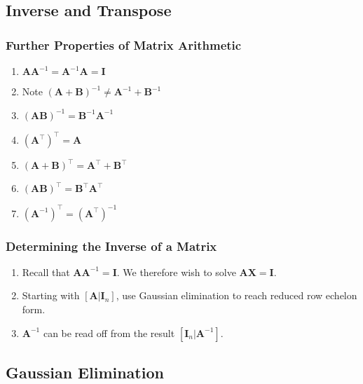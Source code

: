 \documentclass[10pt,twoside,twocolumn]{article}
\begin{document}
\subsection{Inverse and Transpose}


\subsubsection{Further Properties of Matrix Arithmetic}
\begin{enumerate}
\item $\mathbf{A}\mathbf{A}^{-1}=\mathbf{A}^{-1}\mathbf{A}=\mathbf{I}$ 
\item Note $\left(\mathbf{A}+\mathbf{B}\right)^{-1}\neq\mathbf{A}^{-1}+\mathbf{B}^{-1}$ 
\item $\left(\mathbf{A}\mathbf{B}\right)^{-1}=\mathbf{B}^{-1}\mathbf{A}^{-1}$\\
 
\item $\left(\mathbf{A}^{\top}\right)^{\top}=\mathbf{A}$ 
\item $\left(\mathbf{A}+\mathbf{B}\right)^{\top}=\mathbf{A}^{\top}+\mathbf{B}^{\top}$ 
\item $\left(\mathbf{A}\mathbf{B}\right)^{\top}=\mathbf{B}^{\top}\mathbf{A}^{\top}$\\
 
\item $\left(\mathbf{A}^{-1}\right)^{\top}=\left(\mathbf{A}^{\top}\right)^{-1}$ 
\end{enumerate}

\subsubsection{Determining the Inverse of a Matrix}
\begin{enumerate}
\item Recall that $\mathbf{A}\mathbf{A}^{-1}=\mathbf{I}$. We therefore
wish to solve $\mathbf{A}\mathbf{X}=\mathbf{I}$. 
\item Starting with $\left[\mathbf{A}|\mathbf{I}_{n}\right]$, use Gaussian
elimination to reach reduced row echelon form. 
\item $\mathbf{A}^{-1}$ can be read off from the result $\left[\mathbf{I}_{n}|\mathbf{A}^{-1}\right]$. 
\end{enumerate}

\subsection{Gaussian Elimination}
\end{document}
